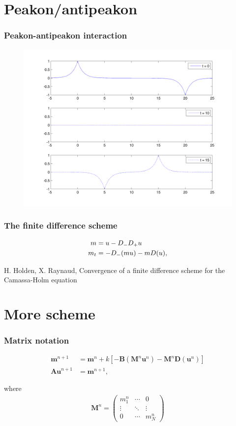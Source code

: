 \documentclass{beamer}
\begin{document}
\section{Peakon/antipeakon}
\begin{frame}
\frametitle{Peakon-antipeakon interaction}
\begin{figure}
\includegraphics[width=0.8\linewidth]{gfx/peakonantipeakon}
\end{figure}

\end{frame}


\begin{frame}
\frametitle{The finite difference scheme}

\begin{align*}
m &= u - D_- D_+ u \notag \\
m_t &=- D_- ( m u ) - m D ( u ), 
\end{align*} 

\vspace{3.5cm}

\tiny{H. Holden, X. Raynaud, Convergence of a finite difference scheme for the Camassa-Holm equation}


\end{frame}



\section*{More scheme}
\begin{frame}
\frametitle{Matrix notation}
\begin{align*}
\bm{m}^{n+1} &= \bm{m}^{n} + k \left[- \bm{B} (\bm{M}^n \bm{u}^n) - \bm{M}^n \bm{D} (\bm{u}^n)\right] \\
\bm{Au}^{n + 1} &= \bm{m}^{n+1},
\end{align*}

where 
\begin{align*}
\bm{M}^n = 
\begin{pmatrix}
  m_1^{n} & \cdots & 0 \\
  \vdots  & \ddots & \vdots  \\
  0 & \cdots & m_N^n
 \end{pmatrix}
\end{align*}

\end{frame}
\end{document}
